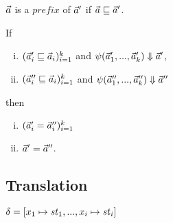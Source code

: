 \begin{defi}
	$\vec a$ is a $prefix$ of $\vec a'$ if $\vec a \sqsubseteq \vec a'$.
\end{defi}
\PT{\Axiom{\emptyv \prefix \a }}


\begin{lem}
	If
	\begin{enumerate}[(i)]
		\item $(\vec a_i' \sqsubseteq  \vec a_i)^k_{i=1}$ and ${\psi}(\vec a_1',...,\vec a_k') \Downarrow \vec a'$, 
		\item $(\vec a_i'' \sqsubseteq \vec a_i)^k_{i=1}$ and
		${\psi}(\vec a_1'',...,\vec a_k'') \Downarrow \vec a''$
	\end{enumerate} 
	then \begin{enumerate}[(i)]
		\item $(\vec a_i' = \vec a_i'')^k_{i=1}$ 
		\item $\vec a' = \vec a''$.
	\end{enumerate}
\end{lem}



\subsection{Translation}
$\del = [x_1 \|-> \st_1,..., x_i \|-> {\st_i}] $


